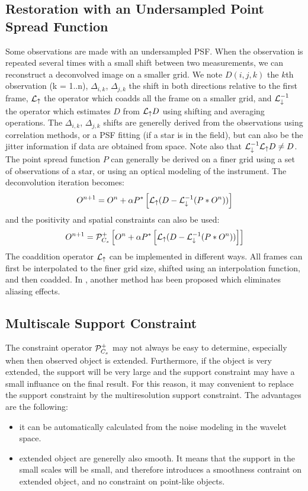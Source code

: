 \documentclass[11pt,a4paper]{article}
\begin{document}
\subsection{Restoration with an Undersampled Point Spread Function}
Some observations are made with an undersampled PSF. When the observation
is repeated several times with a small shift between two measurements, 
we can reconstruct a deconvolved image on a smaller grid. We note
$D(i,j,k)$ the $k$th observation (k = 1..n), 
$\Delta_{i,k}$, $\Delta_{j,k}$ the shift in both directions 
relative to the first frame, ${\cal L}_{\uparrow}$ the operator
which coadds all the frame on a smaller grid, 
and ${\cal L}^{-1}_{\downarrow}$ the
operator which estimates $D$ from 
${\cal L}_{\uparrow} D$ using shifting and averaging operations. 
The $\Delta_{i,k}$, $\Delta_{j,k}$ shifts are generelly derived from the
observations using correlation methods, or a PSF fitting (if a star is in
the field), but can also be the jitter information if data are obtained
from space. Note also that ${\cal L}^{-1}_{\downarrow} {\cal L}_{\uparrow} D \ne D$.
The point spread function $P$ can generally be derived on a finer grid using
a set of observations of a star, or using an optical modeling of the instrument.
The deconvolution iteration becomes:
\begin{eqnarray}
O^{n+1} =  O^{n} + \alpha P^*\left[  {\cal L}_{\uparrow} (D - {\cal L}^{-1}_{\downarrow}(P*O^n)) \right] 
\end{eqnarray}
and the positivity and spatial constraints can also be used:
\begin{eqnarray}
O^{n+1} =  {\cal P}^+_{C_s} \left[  O^{n} + \alpha P^*\left[  {\cal L}_{\uparrow} (D - {\cal L}^{-1}_{\downarrow}(P*O^n)) \right] \right]
\end{eqnarray}
The coaddition operator ${\cal L}_{\uparrow}$ can be implemented in different 
ways. All frames can first be interpolated to the finer grid size,
shifted using an interpolation function, and then coadded. 
In \cite{rest:lauer99}, another method has been proposed which eliminates
aliasing effects.

\subsection{Multiscale Support Constraint}
The constraint operator  ${\cal P}^+_{C_s}$ may not always be easy to 
determine, especially when then observed object is extended. Furthermore,
if the object is very extended, the support will be very large and
the support constraint may have a small influance on the final result. 
For this reason, it may convenient to replace the  
support constraint by the multiresolution support constraint. The advantages
are the following:
\begin{itemize}
\item it can be automatically calculated from the noise modeling in the wavelet
space.
\item extended object are generelly also smooth. It means that the support 
in the small scales will be small, and therefore introduces a   
smoothness contraint on extended object, and no constraint on point-like
objects.
\end{itemize}
\end{document}
